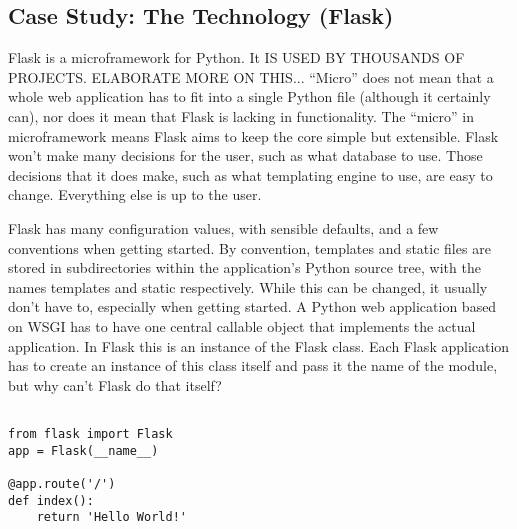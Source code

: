 \newpage



\subsection*{Case Study: The Technology (Flask)}
\label{sec:flask}


 Flask is a microframework for Python. It IS USED BY THOUSANDS OF PROJECTS. ELABORATE MORE ON THIS... 
%
%
 ``Micro'' does not mean that a whole web application has to fit into a single Python file (although it certainly can), nor does it mean that Flask is lacking in functionality. The ``micro'' in microframework means Flask aims to keep the core simple but extensible. Flask won’t make many decisions for the user, such as what database to use. Those decisions that it does make, such as what templating engine to use, are easy to change. Everything else is up to the user.%

 Flask has many configuration values, with sensible defaults, and a few conventions when getting started. By convention, templates and static files are stored in subdirectories within the application's Python source tree, with the names templates and static respectively. While this can be changed, it usually don’t have to, especially when getting started.
%
 A Python web application based on WSGI has to have one central callable object that implements the actual application. In Flask this is an instance of the Flask class. Each Flask application has to create an instance of this class itself and pass it the name of the module, but why can’t Flask do that itself?

\begin{lstlisting}[style=custompython]

from flask import Flask
app = Flask(__name__)

@app.route('/')
def index():
    return 'Hello World!'

\end{lstlisting}


